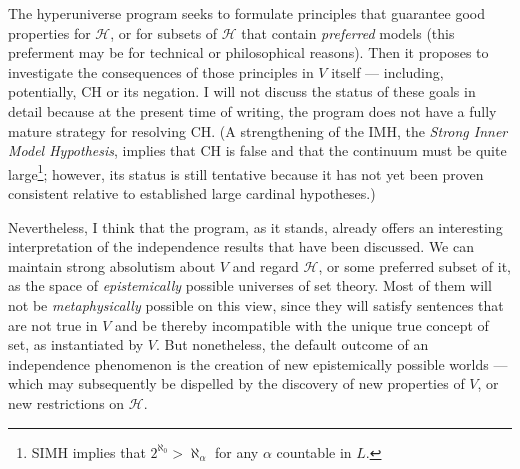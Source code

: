 \documentclass[letterpaper,12pt]{article}
\begin{document}
The hyperuniverse program seeks to formulate principles that guarantee good properties for $\mathcal{H}$, or for subsets of $\mathcal{H}$ that contain \emph{preferred} models (this preferment may be for technical or philosophical reasons). Then it proposes to investigate the consequences of those principles in $V$ itself --- including, potentially, CH or its negation. I will not discuss the status of these goals in detail because at the present time of writing, the program does not have a fully mature strategy for resolving CH. (A strengthening of the IMH, the \emph{Strong Inner Model Hypothesis}, implies that CH is false and that the continuum must be quite large\footnote{SIMH implies that $2^{\aleph_0} > \aleph_\alpha$ for any $\alpha$ countable in $L$.}; however, its status is still tentative because it has not yet been proven consistent relative to established large cardinal hypotheses.)

Nevertheless, I think that the program, as it stands, already offers an interesting interpretation of the independence results that have been discussed. We can maintain strong absolutism about $V$ and regard $\mathcal{H}$, or some preferred subset of it, as the space of \emph{epistemically} possible universes of set theory. Most of them will not be \emph{metaphysically} possible on this view, since they will satisfy sentences that are not true in $V$ and be thereby incompatible with the unique true concept of set, as instantiated by $V$. But nonetheless, the default outcome of an independence phenomenon is the creation of new epistemically possible worlds --- which may subsequently be dispelled by the discovery of new properties of $V$, or new restrictions on $\mathcal{H}$.
\end{document}
